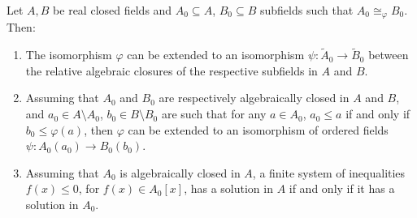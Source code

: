 Let $A, B$ be real closed fields and $A_0 \subseteq A$, $B_0 \subseteq B$ subfields such that $A_0 \cong_{\varphi} B_0$. Then:

\begin{enumerate}
\item[(i)] The isomorphism $\varphi$ can be extended to an isomorphism $\psi : \tilde{A}_0 \to \tilde{B}_0$ between the relative algebraic closures of the respective subfields in $A$ and $B$.
\item[(ii)] Assuming that $A_0$ and $B_0$ are respectively algebraically closed in $A$ and $B$, and $a_0 \in A \setminus A_0$, $b_0 \in B \setminus B_0$ are such that for any $a \in A_0$, $a_0 \leq a$ if and only if $b_0 \leq \varphi(a)$, then $\varphi$ can be extended to an isomorphism of ordered fields $\psi : A_0(a_0) \to B_0(b_0)$.
\item[(iii)] Assuming that $A_0$ is algebraically closed in $A$, a finite system of inequalities $f(x) \leq 0$, for $f(x) \in A_0[x]$, has a solution in $A$ if and only if it has a solution in $A_0$.
\end{enumerate}
